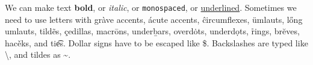 \documentclass{article}
\begin{document}
We can make text \textbf{bold}, or \emph{italic}, or \texttt{monospaced}, or \underline{underlined}. Sometimes we need to use letters with gr\`{a}ve accents, \'{a}cute accents, \^{c}ircumflexes, \"{u}mlauts, l\H{o}ng umlauts, tild\~{e}s, \c{c}edillas, macr\={o}ns, under\b{b}ars, overd\.{o}ts, underd\d{o}ts, \r{r}ings, br\u{e}ves, hac\v{e}ks, and ti\t{es}. Dollar signs have to be escaped like \$. Backslashes are typed like \textbackslash, and tildes as \textasciitilde.
\end{document}
